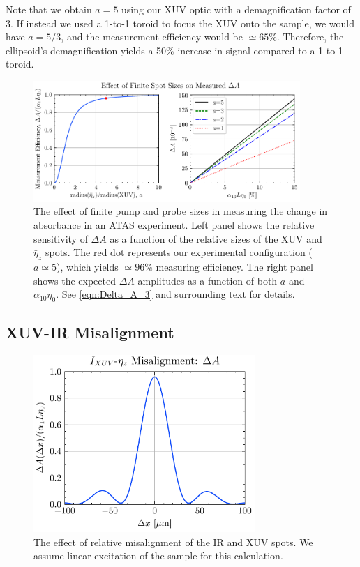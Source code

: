 Note that we obtain $a=5$ using our XUV optic with a demagnification factor of 3. If instead we used a 1-to-1 toroid to focus the XUV onto the sample, we would have $a=5/3$, and the measurement efficiency would be $\simeq 65\%$. Therefore, the ellipsoid's demagnification yields a 50\% increase in signal compared to a 1-to-1 toroid.

\begin{figure}
	\centering
	\includegraphics[width=0.9\textwidth]{figures/chap4/Delta_A_curves.pdf}
	\caption{The effect of finite pump and probe sizes in measuring the change in absorbance in an ATAS experiment. Left panel shows the relative sensitivity of $\Delta A$ as a function of the relative sizes of the XUV and $\bar{\eta}_z$ spots. The red dot represents our experimental configuration ($a\simeq 5$), which yields $\simeq 96\%$ measuring efficiency. The right panel shows the expected $\Delta A$ amplitudes as a function of both $a$ and $\alpha_{10} \eta_0$. See \cref{eqn:Delta_A_3} and surrounding text for details.}
	\label{fig:Delta_A_curve}
\end{figure}


\subsection{XUV-IR Misalignment}

\begin{figure}
	\centering
	\includegraphics[width=0.75\textwidth]{figures/chap4/XUV_eta_misalignment.pdf}
	\caption{The effect of relative misalignment of the IR and XUV spots. We assume linear excitation of the sample for this calculation.}
	\label{fig:XUV_eta_misalignment}
\end{figure}

